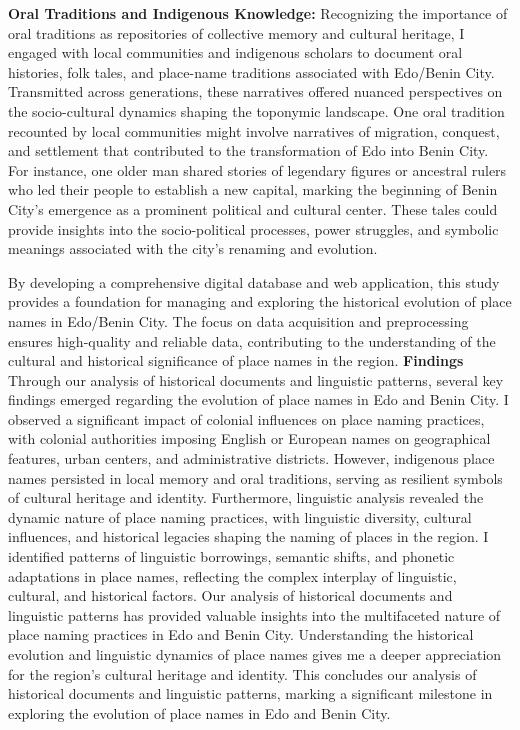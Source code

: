 \textbf{Oral Traditions and Indigenous Knowledge:} Recognizing the importance of oral traditions as repositories of collective memory and cultural heritage, I engaged with local communities and indigenous scholars to document oral histories, folk tales, and place-name traditions associated with Edo/Benin City. Transmitted across generations, these narratives offered nuanced perspectives on the socio-cultural dynamics shaping the toponymic landscape. One oral tradition recounted by local communities might involve narratives of migration, conquest, and settlement that contributed to the transformation of Edo into Benin City. For instance, one older man shared stories of legendary figures or ancestral rulers who led their people to establish a new capital, marking the beginning of Benin City's emergence as a prominent political and cultural center. These tales could provide insights into the socio-political processes, power struggles, and symbolic meanings associated with the city's renaming and evolution.

By developing a comprehensive digital database and web application, this study provides a foundation for managing and exploring the historical evolution of place names in Edo/Benin City. The focus on data acquisition and preprocessing ensures high-quality and reliable data, contributing to the understanding of the cultural and historical significance of place names in the region.
\textbf{Findings}
Through our analysis of historical documents and linguistic patterns, several key findings emerged regarding the evolution of place names in Edo and Benin City. I observed a significant impact of colonial influences on place naming practices, with colonial authorities imposing English or European names on geographical features, urban centers, and administrative districts. However, indigenous place names persisted in local memory and oral traditions, serving as resilient symbols of cultural heritage and identity.
Furthermore, linguistic analysis revealed the dynamic nature of place naming practices, with linguistic diversity, cultural influences, and historical legacies shaping the naming of places in the region. I identified patterns of linguistic borrowings, semantic shifts, and phonetic adaptations in place names, reflecting the complex interplay of linguistic, cultural, and historical factors.
Our analysis of historical documents and linguistic patterns has provided valuable insights into the multifaceted nature of place naming practices in Edo and Benin City. Understanding the historical evolution and linguistic dynamics of place names gives me a deeper appreciation for the region's cultural heritage and identity.
This concludes our analysis of historical documents and linguistic patterns, marking a significant milestone in exploring the evolution of place names in Edo and Benin City.


